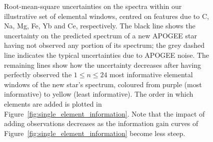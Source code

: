 \documentclass[a4paper,fleqn,usenatbib]{mnras}
\begin{document}
\begin{figure}
    \caption{Root-mean-square uncertainties on the spectra within our illustrative set of elemental windows, centred on features due to C, Na, Mg, Fe, Yb and Ce, respectively. The black line shows the uncertainty on the predicted spectrum of a new APOGEE star having not observed any portion of its spectrum; the grey dashed line indicates the typical uncertainties due to APOGEE noise. The remaining lines show how the uncertainty decreases after having perfectly observed the $1 \le n \le 24$ most informative elemental windows of the new star's spectrum, coloured from purple (most informative) to yellow (least informative). The order in which elements are added is plotted in Figure~\ref{fig:single_element_information}. Note that the impact of adding observations decreases as the information gain curves of Figure~\ref{fig:single_element_information} become less steep.}
    \label{fig:single_element_errs}
\end{figure}
\end{document}
